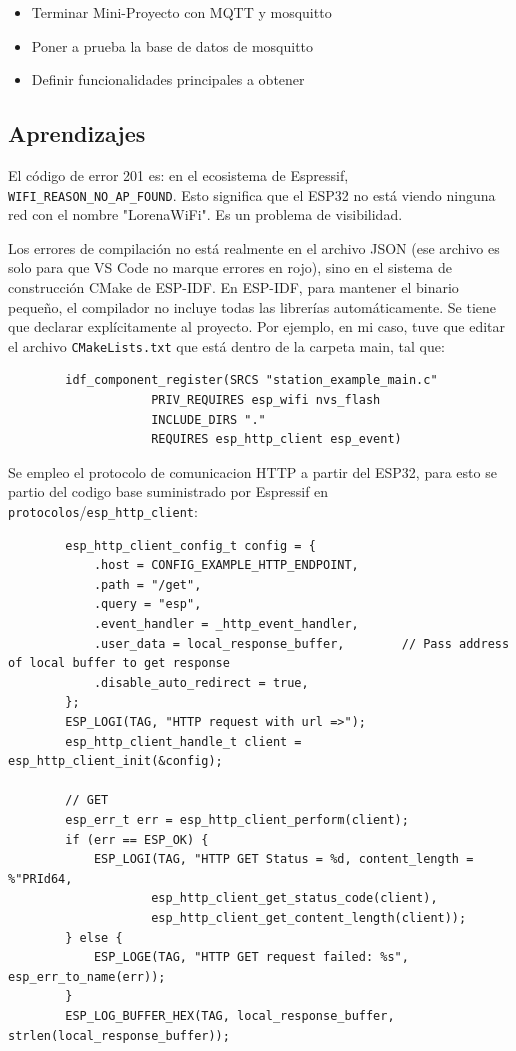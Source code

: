 \documentclass[12pt, a4paper]{article}
\begin{document}
    \begin{itemize}
        \item Terminar Mini-Proyecto con MQTT y mosquitto
        \item Poner a prueba la base de datos de mosquitto
        \item Definir funcionalidades principales a obtener
    \end{itemize}

    \subsection*{Aprendizajes}

    El código de error 201 es: en el ecosistema de Espressif, \texttt{WIFI\_REASON\_NO\_AP\_FOUND}. Esto significa que el ESP32 no está viendo ninguna red con el nombre "LorenaWiFi". Es un problema de visibilidad.

    Los errores de compilación no está realmente en el archivo JSON (ese archivo es solo para que VS Code no marque errores en rojo), sino en el sistema de construcción CMake de ESP-IDF. En ESP-IDF, para mantener el binario pequeño, el compilador no incluye todas las librerías automáticamente. Se tiene que declarar explícitamente al proyecto. Por ejemplo, en mi caso, tuve que editar el archivo \texttt{CMakeLists.txt} que está dentro de la carpeta main, tal que:

    \begin{verbatim}
        idf_component_register(SRCS "station_example_main.c"
                    PRIV_REQUIRES esp_wifi nvs_flash
                    INCLUDE_DIRS "."
                    REQUIRES esp_http_client esp_event)
    \end{verbatim}

    Se empleo el protocolo de comunicacion HTTP a partir del ESP32, para esto se partio del codigo base suministrado por Espressif en \texttt{protocolos}/\texttt{esp\_http\_client}:

    \begin{verbatim}
        esp_http_client_config_t config = {
            .host = CONFIG_EXAMPLE_HTTP_ENDPOINT,
            .path = "/get",
            .query = "esp",
            .event_handler = _http_event_handler,
            .user_data = local_response_buffer,        // Pass address of local buffer to get response
            .disable_auto_redirect = true,
        };
        ESP_LOGI(TAG, "HTTP request with url =>");
        esp_http_client_handle_t client = esp_http_client_init(&config);
    
        // GET
        esp_err_t err = esp_http_client_perform(client);
        if (err == ESP_OK) {
            ESP_LOGI(TAG, "HTTP GET Status = %d, content_length = %"PRId64,
                    esp_http_client_get_status_code(client),
                    esp_http_client_get_content_length(client));
        } else {
            ESP_LOGE(TAG, "HTTP GET request failed: %s", esp_err_to_name(err));
        }
        ESP_LOG_BUFFER_HEX(TAG, local_response_buffer, strlen(local_response_buffer));
    \end{verbatim}
\end{document}
